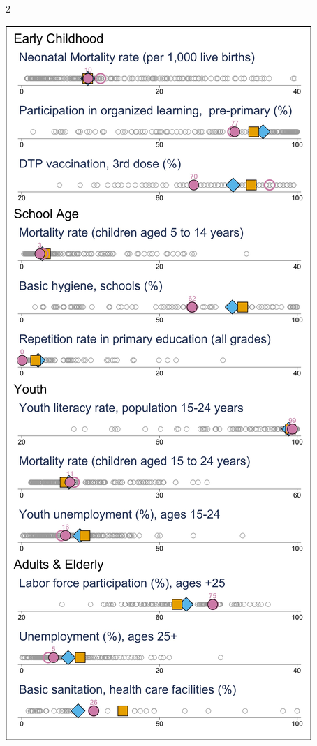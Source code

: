 \documentclass[
  9pt,
]{article}
\begin{document}
\begin {multicols}{2}
\begin{flushright}\includegraphics[height=0.88\textheight]{Graphs/p2_PRY_stages} \end{flushright}

\end {multicols}
\end{document}
